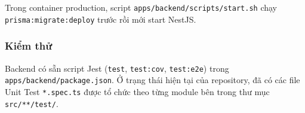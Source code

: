 Trong container production, script \texttt{apps/backend/scripts/start.sh} chạy \texttt{prisma:migrate:deploy} trước rồi mới start NestJS.

\subsubsection{Kiểm thử}

Backend có sẵn script Jest (\texttt{test}, \texttt{test:cov}, \texttt{test:e2e}) trong \texttt{apps/backend/package.json}. Ở trạng thái hiện tại của repository, đã có các file Unit Test \texttt{*.spec.ts} được tổ chức theo từng module bên trong thư mục \texttt{src/**/test/}.
